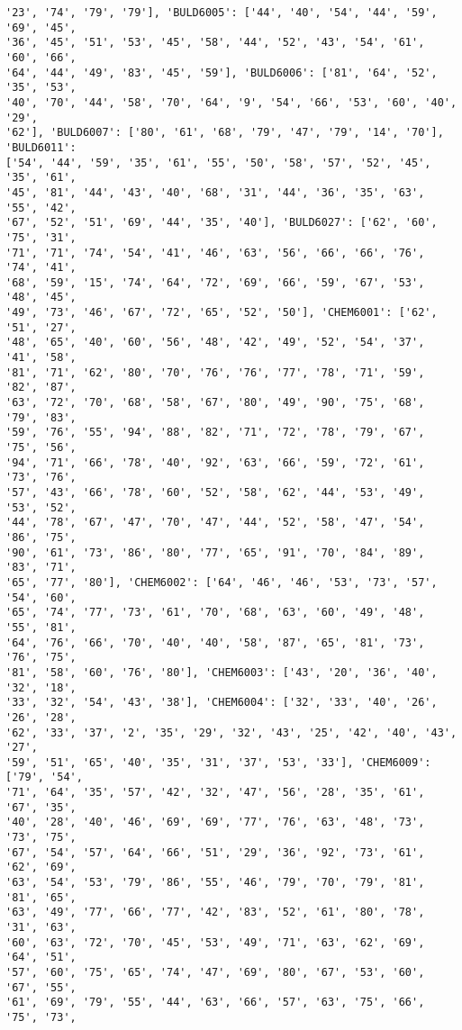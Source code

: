 \documentclass[11pt]{article}
\begin{document}
\begin{Verbatim}[commandchars=\\\{\}]
'23', '74', '79', '79'], 'BULD6005': ['44', '40', '54', '44', '59', '69', '45',
'36', '45', '51', '53', '45', '58', '44', '52', '43', '54', '61', '60', '66',
'64', '44', '49', '83', '45', '59'], 'BULD6006': ['81', '64', '52', '35', '53',
'40', '70', '44', '58', '70', '64', '9', '54', '66', '53', '60', '40', '29',
'62'], 'BULD6007': ['80', '61', '68', '79', '47', '79', '14', '70'], 'BULD6011':
['54', '44', '59', '35', '61', '55', '50', '58', '57', '52', '45', '35', '61',
'45', '81', '44', '43', '40', '68', '31', '44', '36', '35', '63', '55', '42',
'67', '52', '51', '69', '44', '35', '40'], 'BULD6027': ['62', '60', '75', '31',
'71', '71', '74', '54', '41', '46', '63', '56', '66', '66', '76', '74', '41',
'68', '59', '15', '74', '64', '72', '69', '66', '59', '67', '53', '48', '45',
'49', '73', '46', '67', '72', '65', '52', '50'], 'CHEM6001': ['62', '51', '27',
'48', '65', '40', '60', '56', '48', '42', '49', '52', '54', '37', '41', '58',
'81', '71', '62', '80', '70', '76', '76', '77', '78', '71', '59', '82', '87',
'63', '72', '70', '68', '58', '67', '80', '49', '90', '75', '68', '79', '83',
'59', '76', '55', '94', '88', '82', '71', '72', '78', '79', '67', '75', '56',
'94', '71', '66', '78', '40', '92', '63', '66', '59', '72', '61', '73', '76',
'57', '43', '66', '78', '60', '52', '58', '62', '44', '53', '49', '53', '52',
'44', '78', '67', '47', '70', '47', '44', '52', '58', '47', '54', '86', '75',
'90', '61', '73', '86', '80', '77', '65', '91', '70', '84', '89', '83', '71',
'65', '77', '80'], 'CHEM6002': ['64', '46', '46', '53', '73', '57', '54', '60',
'65', '74', '77', '73', '61', '70', '68', '63', '60', '49', '48', '55', '81',
'64', '76', '66', '70', '40', '40', '58', '87', '65', '81', '73', '76', '75',
'81', '58', '60', '76', '80'], 'CHEM6003': ['43', '20', '36', '40', '32', '18',
'33', '32', '54', '43', '38'], 'CHEM6004': ['32', '33', '40', '26', '26', '28',
'62', '33', '37', '2', '35', '29', '32', '43', '25', '42', '40', '43', '27',
'59', '51', '65', '40', '35', '31', '37', '53', '33'], 'CHEM6009': ['79', '54',
'71', '64', '35', '57', '42', '32', '47', '56', '28', '35', '61', '67', '35',
'40', '28', '40', '46', '69', '69', '77', '76', '63', '48', '73', '73', '75',
'67', '54', '57', '64', '66', '51', '29', '36', '92', '73', '61', '62', '69',
'63', '54', '53', '79', '86', '55', '46', '79', '70', '79', '81', '81', '65',
'63', '49', '77', '66', '77', '42', '83', '52', '61', '80', '78', '31', '63',
'60', '63', '72', '70', '45', '53', '49', '71', '63', '62', '69', '64', '51',
'57', '60', '75', '65', '74', '47', '69', '80', '67', '53', '60', '67', '55',
'61', '69', '79', '55', '44', '63', '66', '57', '63', '75', '66', '75', '73',

\end{Verbatim}
\end{document}
